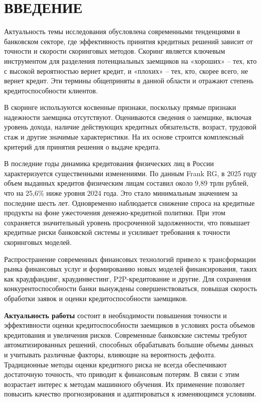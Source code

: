 \section*{ВВЕДЕНИЕ}

Актуальность темы исследования обусловлена современными тенденциями в банковском секторе, где эффективность принятия кредитных решений зависит от точности и скорости скоринговых методов. Скоринг является ключевым инструментом для разделения потенциальных заемщиков на «хороших» -- тех, кто с высокой вероятностью вернет кредит, и «плохих» -- тех, кто, скорее всего, не вернет кредит. Эти термины общеприняты в данной области и отражают степень кредитоспособности клиентов.

В скоринге используются косвенные признаки, поскольку прямые признаки надежности заемщика отсутствуют. Оцениваются сведения о заемщике, включая уровень дохода, наличие действующих кредитных обязательств, возраст, трудовой стаж и другие значимые характеристики. На их основе строится комплексный критерий для принятия решения о выдаче кредита.

В последние годы динамика кредитования физических лиц в России характеризуется существенными изменениями. По данным Frank RG, в 2025 году объем выданных кредитов физическим лицам составил около 9{,}89 трлн рублей, что на 25{,}6\% ниже уровня 2024 года. Это стало минимальным значением за последние шесть лет. Одновременно наблюдается снижение спроса на кредитные продукты на фоне ужесточения денежно-кредитной политики. При этом сохраняется значительный уровень просроченной задолженности, что повышает кредитные риски банковской системы и усиливает требования к точности скоринговых моделей.

Распространение современных финансовых технологий привело к трансформации рынка финансовых услуг и формированию новых моделей финансирования, таких как краудфандинг, краудинвестинг, P2P-кредитование и другие. Для сохранения конкурентоспособности банки вынуждены совершенствоваться, повышая скорость обработки заявок и оценки кредитоспособности заемщиков.


\textbf{Актуальность работы} состоит в необходимости повышения точности и эффективности оценки кредитоспособности заемщиков в условиях роста объемов кредитования и увеличения рисков. Современные банковские системы требуют автоматизированных решений, способных обрабатывать большие объемы данных и учитывать различные факторы, влияющие на вероятность дефолта. Традиционные методы оценки кредитного риска не всегда обеспечивают достаточную точность, что приводит к финансовым потерям. В связи с этим возрастает интерес к методам машинного обучения. Их применение позволяет повысить качество прогнозирования и адаптироваться к изменяющимся условиям.

